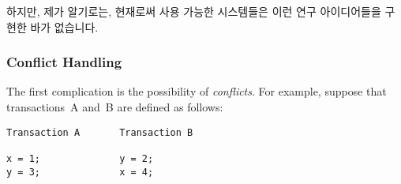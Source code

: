 하지만, 제가 알기로는, 현재로써 사용 가능한 시스템들은 이런 연구 아이디어들을
구현한 바가 없습니다.
\iffalse

\emph{Unbounded transactional memory} (UTM)
schemes~\cite{CScottAnanian2006,KevinEMoore2006}
use DRAM as an extremely large victim cache, but integrating such schemes
into a production-quality cache-coherence mechanism is still an unsolved
problem.
In addition, use of DRAM as a victim cache may have unfortunate
performance and energy-efficiency consequences, particularly
if the victim cache is to be fully associative.
Finally, the ``unbounded'' aspect of UTM assumes that all of DRAM
could be used as a victim cache, while in reality
the large but still fixed amount of DRAM assigned to a given CPU
would limit the size of that CPU's transactions.
Other schemes use a combination of hardware and software transactional
memory~\cite{SanjeevKumar2006} and one could imagine using STM as a
fallback mechanism for HTM.

However, to the best of my knowledge, currently available systems do
not implement any of these research ideas, and perhaps for good reason.
\fi

\subsubsection{Conflict Handling}
\label{sec:future:Conflict Handling}

The first complication is the possibility of \emph{conflicts}.
For example, suppose that transactions~A and~B are defined as follows:

\vspace{5pt}
\begin{minipage}[t]{\columnwidth}
\begin{verbatim}
Transaction A       Transaction B

x = 1;              y = 2;
y = 3;              x = 4;
\end{verbatim}
\end{minipage}
\vspace{5pt}

